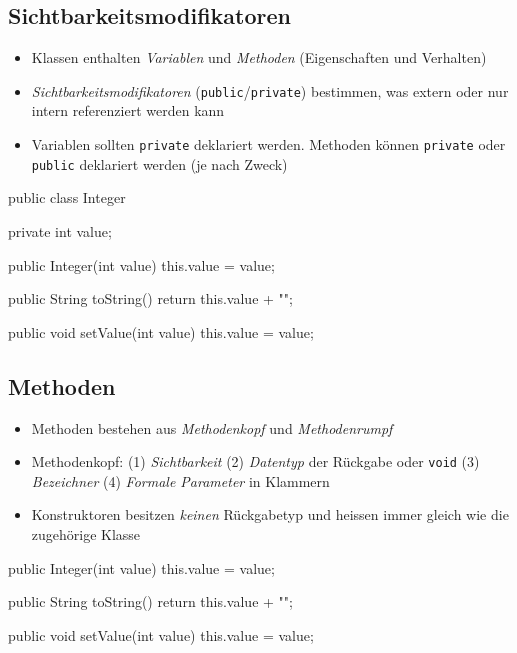 \documentclass[a4paper,10pt, dvipsnames]{report}
\newcommand{\javaInLine}[1]{\texttt{#1}}
\begin{document}
\subsection{Sichtbarkeitsmodifikatoren}

\begin{itemize}
    \item Klassen enthalten \textit{Variablen} und \textit{Methoden} (Eigenschaften und Verhalten)
    \item \textit{Sichtbarkeitsmodifikatoren} (\javaInLine{public}/\javaInLine{private}) bestimmen, was extern oder nur intern referenziert werden kann
    \item Variablen sollten \javaInLine{private} deklariert werden. Methoden können \javaInLine{private} oder \javaInLine{public} deklariert werden (je nach Zweck)
\end{itemize}



\begin{javacodebox}
public class Integer {

    private int value;

    public Integer(int value) {
    this.value = value;
    }

    public String toString() {
    return this.value + "";
    }

    public void setValue(int value) {
    this.value = value;
    }
}
\end{javacodebox}

\subsection{Methoden}

\begin{itemize}
    \item Methoden bestehen aus \textit{Methodenkopf} und \textit{Methodenrumpf}
    \item Methodenkopf: (1) \textit{Sichtbarkeit} (2) \textit{Datentyp} der Rückgabe oder \javaInLine{void} (3) \textit{Bezeichner} (4) \textit{Formale Parameter} in Klammern
    \item Konstruktoren besitzen \textit{keinen} Rückgabetyp und heissen immer gleich wie die zugehörige Klasse
\end{itemize}

\begin{javacodebox}
public Integer(int value) {
    this.value = value;
}

public String toString() {
    return this.value + "";
}

public void setValue(int value) {
    this.value = value;
}
\end{javacodebox}
\end{document}

